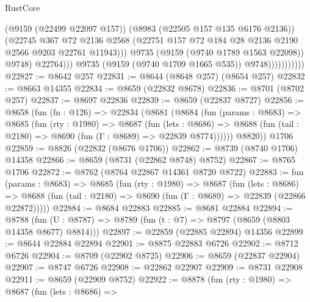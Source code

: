 \begin{lexlean}{RustCore}
\begin{coremodule}
                                    (@9159 (@22499 @22097 @157))
                                    (@8983 (@22505 @157 @135 @6176 @2136))
                                    (@22745
                                      @367
                                      @72
                                      @2136
                                      @2568
                                      (@22751
                                        @157
                                        @72
                                        @184
                                        @28
                                        @2136
                                        @2190
                                        @2566
                                        @9203
                                        @22761
                                        @11943)))
                                  @9735
                                  (@9159 (@9740 @1789 @1563 @22098))
                                  @9748)
                                @22764)))
                          @9735
                          (@9159 (@9740 @1709 @1665 @535))
                          @9748)))))))))))
@22827 := @8642 @257
@22831 := @8644 (@8648 @257) (@8654 @257)
@22832 := @8663 @14355
@22834 := @8659 (@22832 @8678)
@22836 := @8701 (@8702 @257)
@22837 := @8697 @22836
@22839 := @8659 (@22837 @8727)
@22856 := @8658
    (fun (fn : @126) =>
    @22834
      (@8681
        (@8684
          (fun (params : @8683) =>
          @8685
            (fun (rty : @1980) =>
            @8687
              (fun (lets : @8686) =>
              @8688 (fun (tail : @2180) => @8690 (fun (Γ : @8689) => @22839 @8774))))))
        @8820))
    @1706
@22859 := @8826 (@22832 (@8676 @1706))
@22862 := @8739 (@8740 @1706) @14358
@22866 := @8659 (@8731 (@22862 @8748) @8752)
@22867 := @8765 @1706
@22872 := @8762 (@8764 @22867 @14361 @8720 @8722)
@22883 := fun (params : @8683) =>
  @8685
    (fun (rty : @1980) =>
    @8687
      (fun (lets : @8686) =>
      @8688 (fun (tail : @2180) => @8690 (fun (Γ : @8689) => @22839 (@22866 @22872)))))
@22884 := @8684 @22883
@22885 := @8681 @22884
@22894 := @8788
    (fun (U : @8787) => @8789 (fun (t : @7) => @8797 (@8659 (@8803 @14358 @8677) @8814)))
@22897 := @22859 (@22885 @22894) @14356
@22899 := @8644 @22884 @22894
@22901 := @8875 @22883 @6726
@22902 := @8712 @6726
@22904 := @8709 (@22902 @8725)
@22906 := @8659 (@22837 @22904)
@22907 := @8747 @6726
@22908 := @22862 @22907
@22909 := @8731 @22908
@22911 := @8659 (@22909 @8752)
@22922 := @8878
    (fun (rty : @1980) =>
    @8687
      (fun (lets : @8686) =>

\end{coremodule}
\end{lexlean}
